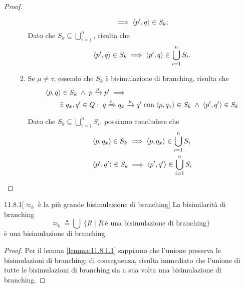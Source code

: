 \begin{proof}
\begin{enumerate}[leftmargin=*]
\begin{enumerate}
\[	\implies \langle p',q \rangle \in S_k;
\]
Dato che $S_k \subseteq \bigcup_{i=1}^{n}$, risulta che \[
	\langle p',q \rangle \in S_k \implies \langle p',q \rangle \in \bigcup_{i=1}^{n} S_i.
\]
\item Se $\mu \neq \tau$, essendo che $S_k$ è bisimulazione di branching, risulta che
\begin{align*}
	&\langle p,q \rangle \in S_k \; \land \; p \xrightarrow{\mu} p' \implies \\
	&\hspace{2em} \exists\ q_x, q' \in Q :\; q \xRightarrow{\varepsilon} q_x \xrightarrow{\mu} q' 
	\; \text{con} \; \langle p, q_x \rangle \in S_k \; \land \; \langle p', q' \rangle \in S_k
\end{align*}
Dato che $S_k \subseteq \bigcup_{i=1}^{n} S_i$, possiamo concludere che
\begin{align*}
	&\langle p, q_x \rangle \in S_k  \implies \langle p, q_x \rangle \in \bigcup_{i=1}^{n} S_i \\
	&\langle p', q' \rangle \in S_k  \implies \langle p', q' \rangle \in \bigcup_{i=1}^{n} S_i
\end{align*}
\end{enumerate}
\end{enumerate}
\end{proof}

\begin{customthm}{11.8.1}[$\approx_b$ è la più grande bisimulazione di branching]
\label{th:11.8.1}
La bisimilarità di branching \[
	\approx_b \triangleq \bigcup\ \{R \mid R\ \text{è una bisimulazione di branching}\}
\]
è una bisimulazione di branching.
\end{customthm}
\begin{proof}
Per il lemma \ref{lemma:11.8.1.1} sappiamo che l'unione preserva le bisimulazioni di branching; di conseguenza, risulta immediato che l'unione di tutte le bisimulazioni di branching sia a sua volta una bisimulazione di branching.
\end{proof}

